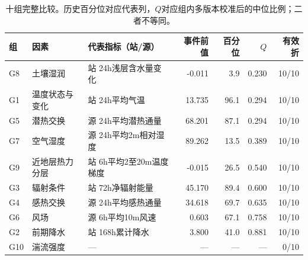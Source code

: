 \begin{table}[H]\centering\scriptsize
\caption{十组完整比较。历史百分位对应代表列，$Q$对应组内多版本校准后的中位比例；二者不等同。}
\label{tab:q1:comparison}
\begin{tabularx}{\linewidth}{llXrrrr}\toprule 组 & 因素 & 代表指标（站/源） & 事件前值 & 百分位 & $Q$ & 有效折\\\midrule
G8 & 土壤湿润 & 站 24h浅层含水量变化 & -0.011 & 3.9 & 0.230 & 10/10 \\
G1 & 温度状态与变化 & 站 24h平均气温 & 13.735 & 96.1 & 0.294 & 10/10 \\
G5 & 潜热交换 & 源 24h平均潜热通量 & 68.201 & 87.1 & 0.294 & 10/10 \\
G7 & 空气湿度 & 源 24h平均2m相对湿度 & 89.262 & 13.5 & 0.389 & 10/10 \\
G9 & 近地层热力分层 & 站 6h平均2至20m温度梯度 & -0.015 & 26.5 & 0.540 & 10/10 \\
G3 & 辐射条件 & 站 72h净辐射能量 & 45.170 & 89.4 & 0.600 & 10/10 \\
G4 & 感热交换 & 源 24h平均感热通量 & 34.618 & 69.7 & 0.635 & 10/10 \\
G6 & 风场 & 源 6h平均10m风速 & 0.603 & 67.1 & 0.758 & 10/10 \\
G2 & 前期降水 & 站 168h累计降水 & 3.800 & 41.0 & 0.881 & 10/10 \\
G10 & 湍流强度 & — & — & — & — & 0/10 \\
\bottomrule\end{tabularx}\end{table}
